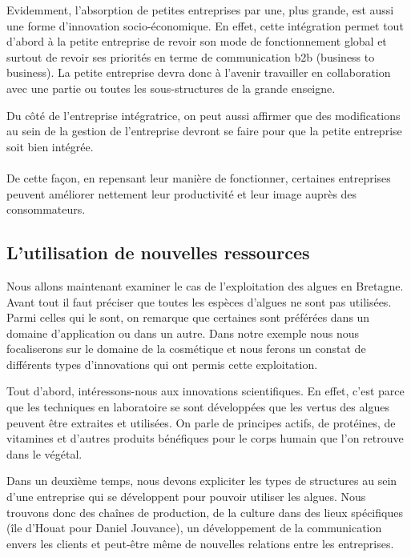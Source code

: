 \documentclass[a4paper,12pt]{report}
\begin{document}
			Evidemment, l’absorption de petites entreprises par une, plus grande, est aussi une forme d’innovation socio-économique. En effet, cette intégration permet tout d’abord à la petite entreprise de revoir son mode de fonctionnement global et surtout de revoir ses priorités en terme de communication b2b (business to business). La petite entreprise devra donc à l’avenir travailler en collaboration avec une partie ou toutes les sous-structures de la grande enseigne.

			Du côté de l’entreprise intégratrice, on peut aussi affirmer que des modifications au sein de la gestion de l’entreprise devront se faire pour que la petite entreprise soit bien intégrée. 
			
			\paragraph{}De cette façon, en repensant leur manière de fonctionner, certaines entreprises peuvent améliorer nettement leur productivité et leur image auprès des consommateurs.
			
			
				
		\subsection{L'utilisation de nouvelles ressources}
			Nous allons maintenant examiner le cas de l’exploitation des algues en Bretagne.
			Avant tout il faut préciser que toutes les espèces d’algues ne sont pas utilisées. Parmi celles qui le sont, on remarque que certaines sont préférées dans un domaine d’application ou dans un autre. Dans notre exemple nous nous focaliserons sur le domaine de la cosmétique et nous ferons un constat de différents types d’innovations qui ont permis cette exploitation.
			
			Tout d’abord, intéressons-nous aux innovations scientifiques. En effet, c’est parce que les techniques en laboratoire se sont développées que les vertus des algues peuvent être extraites et utilisées. On parle de principes actifs, de protéines, de vitamines et d’autres produits bénéfiques pour le corps humain que l’on retrouve dans le végétal.
			
			Dans un deuxième temps, nous devons expliciter les types de structures au sein d’une entreprise qui se développent pour pouvoir utiliser les algues. Nous trouvons donc des chaînes de production, de la culture dans des lieux spécifiques (île d’Houat pour Daniel Jouvance)\cite{Algues}, un développement de la communication envers les clients et peut-être même de nouvelles relations entre les entreprises.
			
\end{document}
